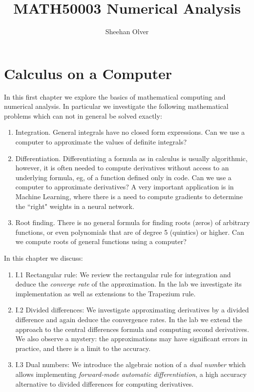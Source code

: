 \documentclass[12pt,a4paper]{book}
\title{ MATH50003 Numerical Analysis }
\author{ Sheehan Olver }
\theoremstyle{definition}
\begin{document}
\maketitle

\tableofcontents

\chapter{Calculus on a Computer}

In this first chapter we explore the basics of mathematical computing and numerical analysis.
In particular we investigate the following mathematical problems which can not in general be solved exactly:

\begin{enumerate}
\item Integration. General integrals have no closed form expressions. Can we use a computer to approximate the values of definite integrals?
\item Differentiation. Differentiating a formula as in calculus is usually algorithmic, however, it is often needed to compute derivatives without access to an underlying formula, eg, of a function defined only in code. Can we use a computer to approximate derivatives?  A very important application is in Machine Learning, where there is a need to compute gradients to determine the ``right" weights in a neural network. 
\item Root finding. There is no general formula for finding roots (zeros) of arbitrary functions, or even polynomials that are of degree 5 (quintics) or higher. Can we compute roots of general functions using a computer?
\end{enumerate}

In this chapter we discuss:

\begin{enumerate}
\item I.1 Rectangular rule: We review the rectangular rule for integration and deduce the {\it converge rate} of the approximation. In the lab  we investigate its implementation as well as extensions to the Trapezium rule. 
\item I.2 Divided differences: We investigate approximating derivatives by a divided difference and again deduce the convergence rates. In the lab we extend the approach to the central differences formula and computing second derivatives. We also observe a mystery: the approximations may have significant errors in practice, and there is a limit to the accuracy.
\item I.3 Dual numbers:  We introduce the algebraic notion of a {\it dual number} which allows implementing {\it forward-mode automatic differentiation}, a high accuracy alternative to divided differences for computing derivatives.
\end{enumerate}






\end{document}
